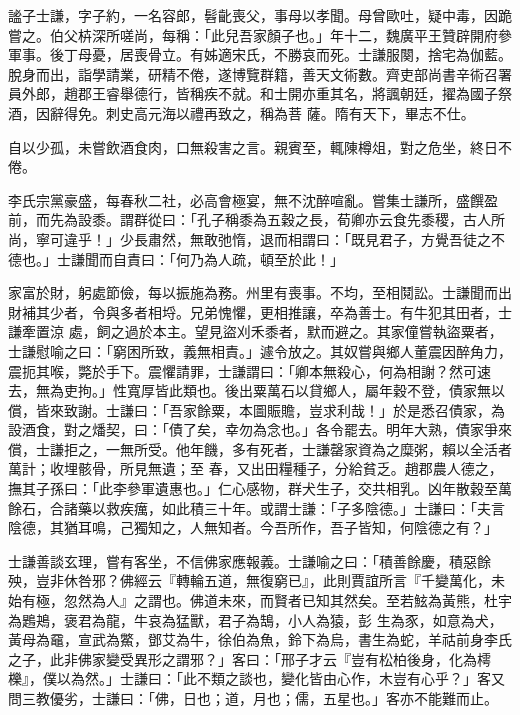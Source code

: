 \begin{pinyinscope}
 謐子士謙，字子約，一名容郎，髫齔喪父，事母以孝聞。母曾歐吐，疑中毒，因跪嘗之。伯父枿深所嗟尚，每稱：「此兒吾家顏子也。」年十二，魏廣平王贊辟開府參軍事。後丁母憂，居喪骨立。有姊適宋氏，不勝哀而死。士謙服闋，捨宅為伽藍。脫身而出，詣學請業，研精不倦，遂博覽群籍，善天文術數。齊吏部尚書辛術召署員外郎，趙郡王睿舉德行，皆稱疾不就。和士開亦重其名，將諷朝廷，擢為國子祭酒，因辭得免。刺史高元海以禮再致之，稱為菩
 薩。隋有天下，畢志不仕。



 自以少孤，未嘗飲酒食肉，口無殺害之言。親賓至，輒陳樽俎，對之危坐，終日不倦。



 李氏宗黨豪盛，每春秋二社，必高會極宴，無不沈醉喧亂。嘗集士謙所，盛饌盈前，而先為設黍。謂群從曰：「孔子稱黍為五穀之長，荀卿亦云食先黍稷，古人所尚，寧可違乎！」少長肅然，無敢弛惰，退而相謂曰：「既見君子，方覺吾徒之不德也。」士謙聞而自責曰：「何乃為人疏，頓至於此！」



 家富於財，躬處節儉，每以振施為務。州里有喪事。不均，至相鬩訟。士謙聞而出財補其少者，令與多者相埒。兄弟愧懼，更相推讓，卒為善士。有牛犯其田者，士謙牽置涼
 處，飼之過於本主。望見盜刈禾黍者，默而避之。其家僮嘗執盜粟者，士謙慰喻之曰：「窮困所致，義無相責。」遽令放之。其奴嘗與鄉人董震因醉角力，震扼其喉，斃於手下。震懼請罪，士謙謂曰：「卿本無殺心，何為相謝？然可速去，無為吏拘。」性寬厚皆此類也。後出粟萬石以貸鄉人，屬年穀不登，債家無以償，皆來致謝。士謙曰：「吾家餘粟，本圖賑贍，豈求利哉！」於是悉召債家，為設酒食，對之燔契，曰：「債了矣，幸勿為念也。」各令罷去。明年大熟，債家爭來償，士謙拒之，一無所受。他年饑，多有死者，士謙罄家資為之糜粥，賴以全活者萬計；收埋骸骨，所見無遺；至
 春，又出田糧種子，分給貧乏。趙郡農人德之，撫其子孫曰：「此李參軍遺惠也。」仁心感物，群犬生子，交共相乳。凶年散穀至萬餘石，合諸藥以救疾癘，如此積三十年。或謂士謙：「子多陰德。」士謙曰：「夫言陰德，其猶耳鳴，己獨知之，人無知者。今吾所作，吾子皆知，何陰德之有？」



 士謙善談玄理，嘗有客坐，不信佛家應報義。士謙喻之曰：「積善餘慶，積惡餘殃，豈非休咎邪？佛經云『轉輪五道，無復窮已』，此則賈誼所言『千變萬化，未始有極，忽然為人』之謂也。佛道未來，而賢者已知其然矣。至若鮌為黃熊，杜宇為鶗鴂，褒君為龍，牛哀為猛獸，君子為鵠，小人為猿，彭
 生為豕，如意為犬，黃母為黿，宣武為鱉，鄧艾為牛，徐伯為魚，鈴下為烏，書生為蛇，羊祜前身李氏之子，此非佛家變受異形之謂邪？」客曰：「邢子才云『豈有松柏後身，化為樗櫟』，僕以為然。」士謙曰：「此不類之談也，變化皆由心作，木豈有心乎？」客又問三教優劣，士謙曰：「佛，日也；道，月也；儒，五星也。」客亦不能難而止。




\end{pinyinscope}
